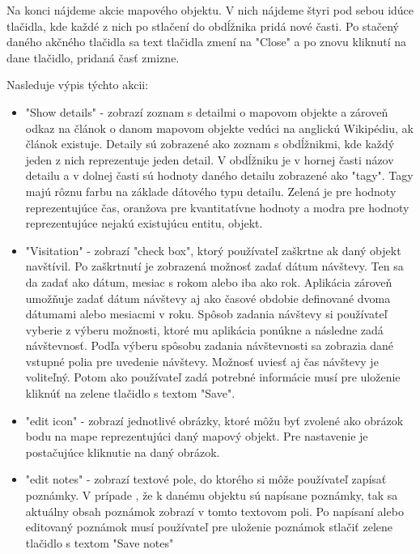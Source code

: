 Na konci nájdeme akcie mapového objektu. V nich nájdeme štyri pod sebou idúce tlačidla, kde každé z nich po stlačení do obdĺžnika pridá nové časti.
Po stačený daného akčného tlačidla sa text tlačidla zmení na "Close" a po znovu kliknutí na dane tlačidlo, pridaná časť zmizne.

Nasleduje výpis týchto akcii:
\begin{itemize}
      \item "Show details" - zobrazí zoznam s detailmi o mapovom objekte a zároveň odkaz na článok o danom mapovom objekte vedúci na anglickú Wikipédiu, ak článok existuje.
            Detaily sú zobrazené ako zoznam s obdĺžnikmi, kde každý jeden z nich reprezentuje jeden detail. V obdĺžniku je v hornej časti názov detailu a v dolnej časti sú hodnoty daného detailu
            zobrazené ako "tagy". Tagy majú rôznu farbu na základe dátového typu detailu. Zelená je pre hodnoty reprezentujúce čas, oranžova pre kvantitatívne hodnoty a modra pre hodnoty reprezentujúce nejakú
            existujúcu entitu, objekt.
      \item "Visitation" - zobrazí "check box", ktorý používateľ zaškrtne ak daný objekt navštívil. Po zaškrtnutí je zobrazená možnosť zadať dátum návštevy. Ten sa da zadať ako dátum, mesiac s rokom alebo iba ako rok.
            Aplikácia zároveň umožňuje zadať dátum návštevy aj ako časové obdobie definované dvoma dátumami alebo mesiacmi v roku. Spôsob zadania návštevy si používateľ vyberie z výberu možnosti, ktoré mu aplikácia ponúkne a následne zadá návštevnosť.
            Podľa výberu spôsobu zadania návštevnosti sa zobrazia dané vstupné polia pre uvedenie návštevy. Možnosť uviesť aj čas návštevy je voliteľný. Potom ako používateľ zadá potrebné informácie musí pre uloženie kliknúť na zelene tlačidlo s textom "Save".
      \item "edit icon" - zobrazí jednotlivé obrázky, ktoré môžu byť zvolené ako obrázok bodu na mape reprezentujúci daný mapový objekt. Pre nastavenie je postačujúce kliknutie na daný obrázok.
      \item "edit notes" - zobrazí textové pole, do ktorého si môže používateľ zapísať poznámky. V prípade , že k danému objektu sú napísane poznámky, tak sa aktuálny obsah poznámok zobrazí v tomto textovom poli.
            Po napísaní alebo editovaný poznámok musí používateľ pre uloženie poznámok stlačiť zelene tlačidlo s textom "Save notes"
\end{itemize}

